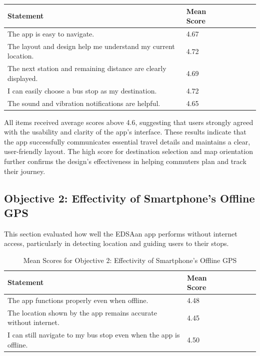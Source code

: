 \documentclass{icsthesis}
\begin{document}
\begin{mainmatter}
\begin{table}[ht]
				\label{table:Mean Scores for Objective 1: Mobile App Interface Tailored for EDSA Carousel Travel}
				\begin{tabular}{llllll}
				\hline
				\hline
				Statement & Mean Score \\ \hline
				The app is easy to navigate. & 4.67 \\
				The layout and design help me understand my current location. & 4.72 \\
				The next station and remaining distance are clearly displayed. & 4.69 \\
                I can easily choose a bus stop as my destination. & 4.72 \\
                The sound and vibration notifications are helpful. & 4.65 \\
                \hline\hline
				\end{tabular} 
			\vspace{4ex}
			\end{table}

All items received average scores above 4.6, suggesting that users strongly agreed with the usability and clarity of the app’s interface. These results indicate that the app successfully communicates essential travel details and maintains a clear, user-friendly layout. The high score for destination selection and map orientation further confirms the design’s effectiveness in helping commuters plan and track their journey.

\subsection{Objective 2: Effectivity of Smartphone’s Offline GPS}
This section evaluated how well the EDSAan app performs without internet access, particularly in detecting location and guiding users to their stops.

			\begin{table}[ht]
			\vspace{4ex}
			\centering
				\caption{Mean Scores for Objective 2: Effectivity of Smartphone’s Offline GPS}
				
				\label{table:Mean Scores for Objective 2: Effectivity of Smartphone’s Offline GPS}
				\begin{tabular}{llllll}
				\hline
				\hline
				Statement & Mean Score \\ \hline
				The app functions properly even when offline. & 4.48 \\
				The location shown by the app remains accurate without internet. & 4.45 \\
				I can still navigate to my bus stop even when the app is offline. & 4.50 \\
                \hline\hline
				\end{tabular} 
			\vspace{4ex}
			\end{table}


\end{mainmatter}
\end{document}
